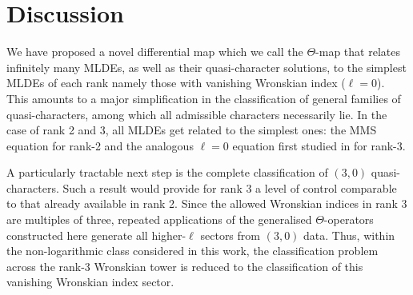 \documentclass[11pt]{article}
\begin{document}
\section{Discussion}

We have proposed a novel differential map which we call the $\Theta$-map that relates infinitely many MLDEs, as well as their quasi-character solutions, to the simplest MLDEs of each rank namely those with vanishing Wronskian index ($\ell=0$). This amounts to a major simplification in the classification of general families of quasi-characters, among which all admissible characters necessarily lie. In the case of rank 2 and 3, all MLDEs get related to the simplest ones: the MMS equation \cite{Mathur:1988na} for rank-2 and the analogous $\ell=0$ equation first studied in \cite{Mathur:1988gt} for rank-3.

A particularly tractable next step is the complete classification of $(3,0)$ quasi-characters. Such a result would provide for rank 3 a level of control comparable to that already available in rank 2. Since the allowed Wronskian indices in rank 3 are multiples of three, repeated applications of the generalised $\Theta$-operators constructed here generate all higher-$\ell$ sectors from $(3,0)$ data. Thus, within the non-logarithmic class considered in this work, the classification problem across the rank-3 Wronskian tower is reduced to the classification of this vanishing Wronskian index sector.
\end{document}
